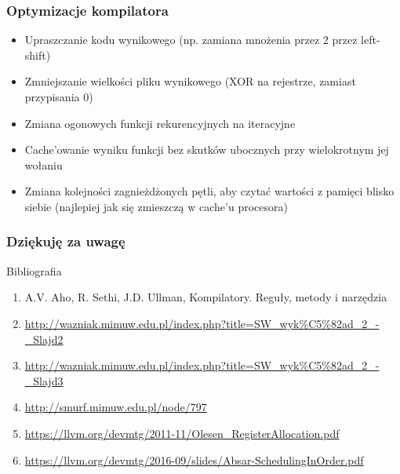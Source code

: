 \documentclass{beamer}
\begin{document}
	\begin{frame}
		\frametitle{Optymizacje kompilatora}
		\begin{itemize}
			\item Upraszczanie kodu wynikowego (np. zamiana mnożenia przez 2 przez left-shift)
			\item Zmniejszanie wielkości pliku wynikowego (XOR na rejestrze, zamiast przypisania 0)
			\item Zmiana ogonowych funkcji rekurencyjnych na iteracyjne
			\item Cache'owanie wyniku funkcji bez skutków ubocznych przy wielokrotnym jej wołaniu
			\item Zmiana kolejności zagnieżdżonych pętli, aby czytać wartości z pamięci blisko siebie (najlepiej jak się zmieszczą w cache'u procesora)
		\end{itemize}
	\end{frame}

	\begin{frame}
	 \frametitle{Dziękuję za uwagę}
	 Bibliografia
	 \begin{enumerate}
		\item A.V. Aho, R. Sethi, J.D. Ullman, Kompilatory. Reguły, metody i narzędzia
		\item \url{http://wazniak.mimuw.edu.pl/index.php?title=SW_wyk\%C5\%82ad_2_-_Slajd2}
		\item \url{http://wazniak.mimuw.edu.pl/index.php?title=SW_wyk\%C5\%82ad_2_-_Slajd3}
		\item \url{http://smurf.mimuw.edu.pl/node/797}
		\item \url{https://llvm.org/devmtg/2011-11/Olesen_RegisterAllocation.pdf}
		\item \url{https://llvm.org/devmtg/2016-09/slides/Absar-SchedulingInOrder.pdf}
	 \end{enumerate}
	\end{frame}
\end{document}
